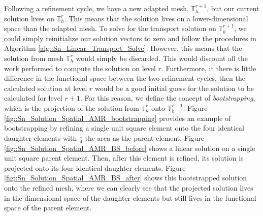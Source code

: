 Following a refinement cycle, we have a new adapted mesh, $\mathbb{T}_h^{r+1}$, but our current solution lives on $\mathbb{T}_h^{r}$. This means that the solution lives on a lower-dimensional space than the adapted mesh. To solve for the transport solution on $\mathbb{T}_h^{r+1}$, we could simply reinitialize our solution vectors to zero and follow the procedures in Algorithm \ref{alg::Sn_Linear_Transport_Solve}. However, this means that the solution from mesh $\mathbb{T}_h^{r}$ would simply be discarded. This would discount all the work performed to compute the solution on level $r$. Furthermore, it there is little difference in the functional space between the two refinement cycles, then the calculated solution at level $r$ would be a good initial guess for the solution to be calculated for level $r+1$. For this reason, we define the concept of {\em bootstrapping}, which is the projection of the solution from $\mathbb{T}_h^{r}$ onto $\mathbb{T}_h^{r+1}$. Figure \ref{fig::Sn_Solution_Spatial_AMR_bootstrapping} provides an example of bootstrapping by refining a single unit square element onto the four identical daughter elements with $\frac{1}{4}$ the area as the parent element. Figure \ref{fig::Sn_Solution_Spatial_AMR_BS_before} shows a linear solution on a single unit square parent element. Then, after this element is refined, its solution is projected onto its four identical daughter elements. Figure \ref{fig::Sn_Solution_Spatial_AMR_BS_after} shows this bootstrapped solution onto the refined mesh, where we can clearly see that the projected solution lives in the dimensional space of the daughter elements but still lives in the functional space of the parent element.


